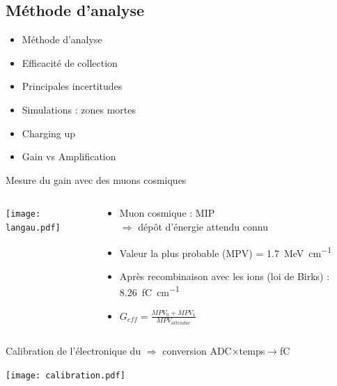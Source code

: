     \subsection{Méthode d'analyse}
    
    \begin{specialframe}
        \begin{itemize}
            \item Méthode d'analyse
            \item Efficacité de collection
            \item Principales incertitudes
            \item Simulations : zones mortes
            \item Charging up
            \item Gain vs Amplification
        \end{itemize}
    \end{specialframe}

    \begin{frame}{Mesure du gain avec des muons cosmiques}
       	\begin{scriptsize}
            \begin{columns}
                \begin{column}{0.6\textwidth}
                    \centering \texttt{[image: langau.pdf]}
                \end{column}\hfill
                \begin{column}{0.4\textwidth}
                    \begin{itemize}
          					\item Muon cosmique : MIP \\ $\Rightarrow$ dépôt d'énergie attendu connu
          					\item Valeur la plus probable (MPV) = \SI{1.7}{\mega\electronvolt\per\centi\meter}
          					\item Après recombinaison avec les ions (loi de Birks) : \SI{8.26}{\femto\coulomb\per\centi\meter}
          					\item $G_{eff}=\frac{MPV_0 + MPV_1}{MPV_{attendue}}$
          				\end{itemize}
                \end{column}
            \end{columns}
            \vspace{0.2cm}
            Calibration de l'électronique du \TOO{} $\Rightarrow$ conversion ADC$\times$temps$\to$\si{\femto\coulomb}
            \begin{center} \texttt{[image: calibration.pdf]} \end{center}
	    \end{scriptsize}
    \end{frame}

